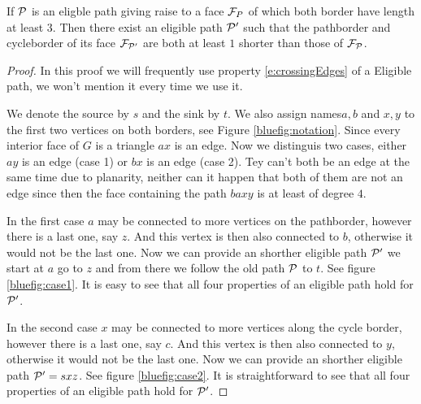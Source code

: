 \begin{lemma}
\label{lem:bluealgo}
If $\P$ is an eligble path giving raise to a face $\F_P$ of which both border have length at least $3$. Then there exist an eligible path $\P'$ such that the pathborder and cycleborder of its face $\F_{\P'}$ are both at least $1$ shorter than those of $\F_\P$.
\end{lemma}

\begin{proof}
In this proof we will frequently use property \ref{e:crossingEdges} of a Eligible path, we won't mention it every time we use it.

We denote the source by $s$ and the sink by $t$. We also assign names$a, b$ and $x, y$ to the first two vertices on both borders, see Figure \ref{bluefig:notation}. Since every interior face of $G$ is a triangle $ax$ is an edge. Now we distinguis two cases, either $ay$ is an edge (case 1) or $bx$ is an edge (case 2). Tey can't both be an edge at the same time due to planarity, neither can it happen that both of them are not an edge since then the face containing the path $baxy$ is at least of degree $4$.

In the first case $a$ may be connected to more vertices on the pathborder, however there is a last one, say $z$. And this vertex is then also connected to $b$, otherwise it would not be the last one. Now we can provide an shorther eligible path $\P'$ we start at $a$ go to $z$ and from there we follow the old path $\P$ to $t$.  See figure \ref{bluefig:case1}. It is easy to see that all four properties of an eligible path hold for $\P'$.

In the second case $x$ may be connected to more vertices along the cycle border, however there is a last one, say $c$. And this vertex is then also connected to $y$, otherwise it would not be the last one. Now we can provide an shorther eligible path $\P' = sxz$.   See figure \ref{bluefig:case2}. It is straightforward to see that all four properties of an eligible path hold for $\P'$. %
\end{proof}

